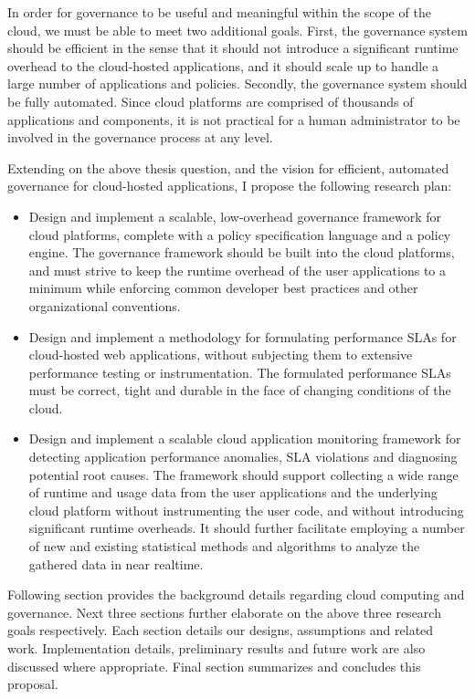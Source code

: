 In order for governance to be
useful and meaningful within the scope of the cloud, we must be able to meet two additional
goals. First, the governance system should be efficient in the sense that it should not introduce
a significant runtime overhead to the cloud-hosted applications, and it should scale up to
handle a large number of applications and policies. Secondly, the governance system should be
fully automated. Since cloud platforms are comprised of thousands of applications and components,
it is not practical for a human administrator to be involved in the governance process at any level.

Extending on the above thesis question, and the vision for efficient, automated governance for
cloud-hosted applications, I propose the following research plan:

\begin{itemize}
\item Design and implement a scalable, low-overhead governance framework for cloud platforms,
complete with a policy specification language and a policy engine. The governance framework should be
built into the cloud platforms, and must
strive to keep the runtime overhead of the user applications to a minimum while enforcing
common developer best practices and other organizational conventions.
\item Design and implement a methodology for formulating performance SLAs for cloud-hosted 
 web applications, without
 subjecting them to extensive performance testing or instrumentation. The formulated
 performance SLAs must be correct, tight and durable in the face of changing
 conditions of the cloud.
 \item Design and implement a scalable cloud application monitoring framework for detecting
application performance anomalies, SLA violations and diagnosing potential root causes. 
The framework should support collecting
 a wide range of runtime and usage data from the user applications and the underlying cloud platform
 without instrumenting the user code, and without introducing significant runtime overheads.
 It should further facilitate employing a number of new and existing statistical methods
 and algorithms to analyze the gathered data in near realtime.
\end{itemize}

Following section provides the background details regarding cloud computing and governance.
Next three sections further elaborate on the above three research goals respectively. 
Each section details our designs, assumptions and related work. Implementation details,
preliminary results and future work are also discussed where appropriate. Final section
summarizes and concludes this proposal.
